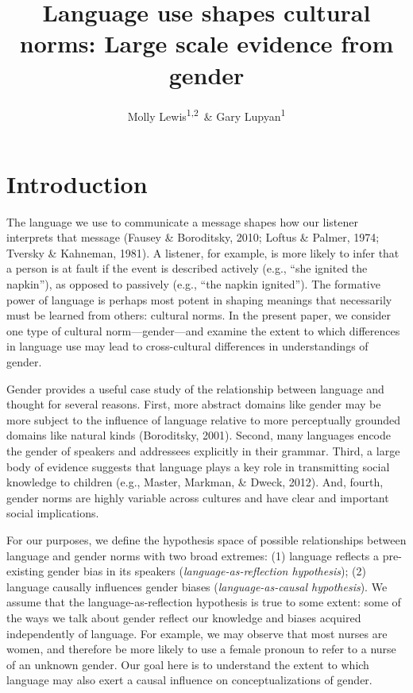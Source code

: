 \documentclass[man,floatsintext]{apa6}
\title{Language use shapes cultural norms: Large scale evidence from gender}
\author{Molly Lewis\textsuperscript{1,2}~\& Gary Lupyan\textsuperscript{1}}
\date{}
\affiliation{
\vspace{0.5cm}
\textsuperscript{1} University of Wisconsin-Madison\\\textsuperscript{2} University of Chicago}
\theoremstyle{definition}
\theoremstyle{definition}
\theoremstyle{definition}
\theoremstyle{remark}
\begin{document}
\maketitle

\section{Introduction}\label{introduction}

The language we use to communicate a message shapes how our listener
interprets that message (Fausey \& Boroditsky, 2010; Loftus \& Palmer,
1974; Tversky \& Kahneman, 1981). A listener, for example, is more
likely to infer that a person is at fault if the event is described
actively (e.g., \enquote{she ignited the napkin}), as opposed to
passively (e.g., \enquote{the napkin ignited}). The formative power of
language is perhaps most potent in shaping meanings that necessarily
must be learned from others: cultural norms. In the present paper, we
consider one type of cultural norm---gender---and examine the extent to
which differences in language use may lead to cross-cultural differences
in understandings of gender.

Gender provides a useful case study of the relationship between language
and thought for several reasons. First, more abstract domains like
gender may be more subject to the influence of language relative to more
perceptually grounded domains like natural kinds (Boroditsky, 2001).
Second, many languages encode the gender of speakers and addressees
explicitly in their grammar. Third, a large body of evidence suggests
that language plays a key role in transmitting social knowledge to
children (e.g., Master, Markman, \& Dweck, 2012). And, fourth, gender
norms are highly variable across cultures and have clear and important
social implications.

For our purposes, we define the hypothesis space of possible
relationships between language and gender norms with two broad extremes:
(1) language reflects a pre-existing gender bias in its speakers
(\emph{language-as-reflection hypothesis}); (2) language causally
influences gender biases (\emph{language-as-causal hypothesis}). We
assume that the language-as-reflection hypothesis is true to some
extent: some of the ways we talk about gender reflect our knowledge and
biases acquired independently of language. For example, we may observe
that most nurses are women, and therefore be more likely to use a female
pronoun to refer to a nurse of an unknown gender. Our goal here is to
understand the extent to which language may also exert a causal
influence on conceptualizations of gender.
\end{document}
